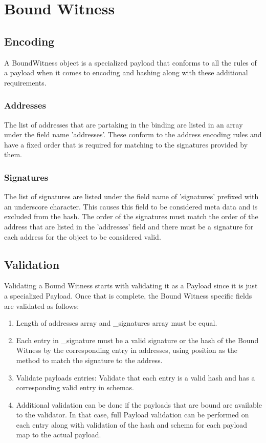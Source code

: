 \documentclass{article}
\begin{document}
\clearpage

\section{Bound Witness}
\subsection{Encoding}
A BoundWitness object is a specialized payload that conforms to all the rules of a payload when it comes to encoding and hashing along with these additional requirements.

\subsubsection{Addresses}
The list of addresses that are partaking in the binding are listed in an array under the field name 'addresses'.  These conform to the address encoding rules and have a fixed order that is required for matching to the signatures provided by them.

\subsubsection{Signatures}
The list of signatures are listed under the field name of 'signatures' prefixed with an underscore character.  This causes this field to be considered meta data and is excluded from the hash.  The order of the signatures must match the order of the address that are listed in the 'addresses' field and there must be a signature for each address for the object to be considered valid.

\subsection{Validation}
Validating a Bound Witness starts with validating it as a Payload since it is just a specialized Payload.  Once that is complete, the Bound Witness specific fields are validated as follows:

\begin{enumerate}
    \item Length of addresses array and \_signatures array must be equal.
    \item Each entry in \_signature must be a valid signature or the hash of the Bound Witness by the corresponding entry in addresses, using position as the method to match the signature to the address.
    \item Validate payloads entries: Validate that each entry is a valid hash and has a corresponding valid entry in schemas.
    \item Additional validation can be done if the payloads that are bound are available to the validator.  In that case, full Payload validation can be performed on each entry along with validation of the hash and schema for each payload map to the actual payload.
\end{enumerate}
\end{document}
